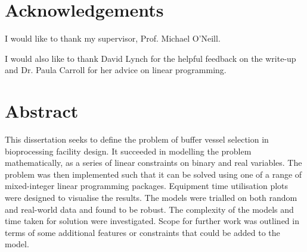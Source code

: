 \documentclass[a4paper,12pt,bibtotoc,oneside]{book} %
\numberwithin{equation}{section}
\numberwithin{figure}{chapter}
\begin{document}
\chapter*{Acknowledgements}

I would like to thank my supervisor, Prof. Michael O'Neill.

I would also like to thank David Lynch for the helpful feedback on the write-up
and Dr. Paula Carroll for her advice on linear programming.

\chapter*{Abstract} 
This dissertation seeks to define the problem of buffer vessel selection in
bioprocessing facility design.
It succeeded in modelling the problem mathematically, as a series of linear
constraints on binary and real variables.
The problem was then implemented such that it can be solved using one of a
range of mixed-integer linear programming packages.
Equipment time utilisation plots were designed to visualise the results.
The models were trialled on both random and real-world data and found to be
robust.
The complexity of the models and time taken for solution were investigated.
Scope for further work was outlined in terms of some additional features or
constraints that could be added to the model.

 
\mainmatter 

\linespread{1.3} %









\backmatter
\end{document}

